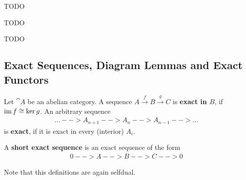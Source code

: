 	\begin{lemma}
		TODO
	\end{lemma}

	\begin{lemma}
		TODO
	\end{lemma}

	\begin{theorem}
		TODO
	\end{theorem}

	\begin{proposition}
		
	\end{proposition}

	\newpage
	\subsection{Exact Sequences, Diagram Lemmas and Exact Functors}

	\begin{definition}
		Let $\cat{A}$ be an abelian category. A sequence $A \xrightarrow{f} B \xrightarrow{g} C$ is \textbf{exact in $B$}, if $\operatorname{im} f \cong \ker g$. An arbitrary sequence
		\begin{align*}
			... --> A_{n+1} --> A_n --> A_{n-1} --> ...
		\end{align*}
		is \textbf{exact}, if it is exact in every (interior) $A_i$.

		A \textbf{short exact sequence} is an exact sequence of the form
		\begin{align*}
			0 --> A --> B --> C --> 0
		\end{align*}

		Note that this definitions are again selfdual.
	\end{definition}

